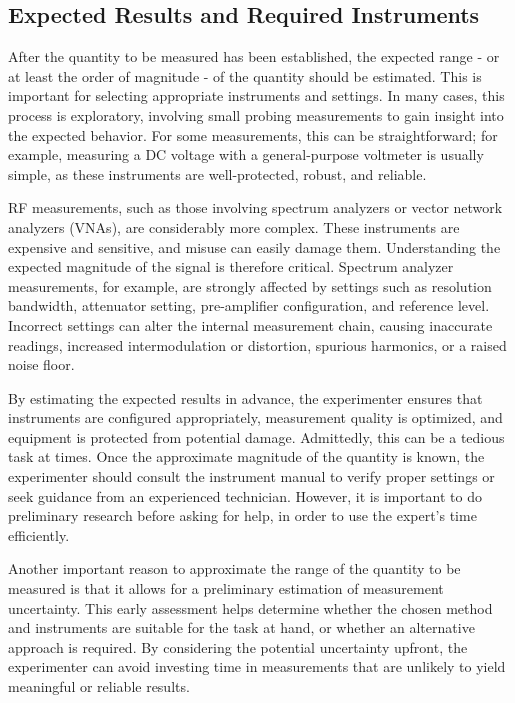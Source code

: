 \subsection{Expected Results and Required Instruments}

After the quantity to be measured has been established, the expected range - or at least the order of magnitude - of the quantity should be estimated. This is important for selecting appropriate instruments and settings. In many cases, this process is exploratory, involving small probing measurements to gain insight into the expected behavior. For some measurements, this can be straightforward; for example, measuring a DC voltage with a general-purpose voltmeter is usually simple, as these instruments are well-protected, robust, and reliable.

RF measurements, such as those involving spectrum analyzers or vector network analyzers (VNAs), are considerably more complex. These instruments are expensive and sensitive, and misuse can easily damage them. Understanding the expected magnitude of the signal is therefore critical. Spectrum analyzer measurements, for example, are strongly affected by settings such as resolution bandwidth, attenuator setting, pre-amplifier configuration, and reference level. Incorrect settings can alter the internal measurement chain, causing inaccurate readings, increased intermodulation or distortion, spurious harmonics, or a raised noise floor.

By estimating the expected results in advance, the experimenter ensures that instruments are configured appropriately, measurement quality is optimized, and equipment is protected from potential damage. Admittedly, this can be a tedious task at times. Once the approximate magnitude of the quantity is known, the experimenter should consult the instrument manual to verify proper settings or seek guidance from an experienced technician. However, it is important to do preliminary research before asking for help, in order to use the expert’s time efficiently.

Another important reason to approximate the range of the quantity to be measured is that it allows for a preliminary estimation of measurement uncertainty. This early assessment helps determine whether the chosen method and instruments are suitable for the task at hand, or whether an alternative approach is required. By considering the potential uncertainty upfront, the experimenter can avoid investing time in measurements that are unlikely to yield meaningful or reliable results.

